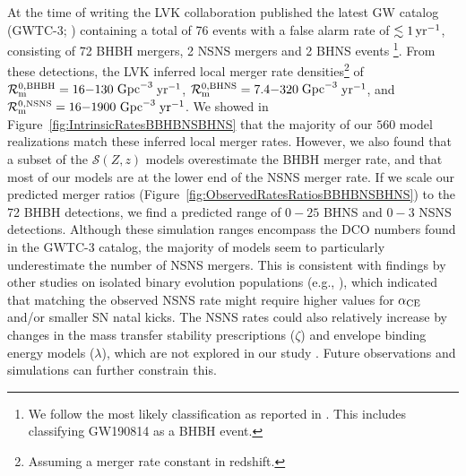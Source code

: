 \documentclass[fleqn,usenatbib]{mnras}
\newcommand\rate{\mathcal{R}}
\newcommand{\yearmin}{\ensuremath{\,\rm{yr}^{-1}}\xspace}
\newcommand{\GpcminThree}{\ensuremath{\,\rm{Gpc}^{-3}}\xspace}
\newcommand{\SFRD}{\ensuremath{\mathcal{S}(Z,z)}\xspace}
\newcommand{\Nmodels}{\ensuremath{560}\xspace}
\newcommand{\RateGWTCmaxBHBH}{\ensuremath{130}\xspace}
\newcommand{\RateGWTCminBHBH}{\ensuremath{16}\xspace}
\newcommand{\RateGWTCmaxBHNS}{\ensuremath{320}\xspace}
\newcommand{\RateGWTCminBHNS}{\ensuremath{7.4}\xspace}
\newcommand{\RateGWTCmaxNSNS}{\ensuremath{1900}\xspace}
\newcommand{\RateGWTCminNSNS}{\ensuremath{16}\xspace}
\begin{document}
At the time of writing the LVK collaboration published the latest \ac{GW} catalog (GWTC-3; \citealt{Abbott:2021GWTC3}) containing a total of 76 events with a false alarm rate of $\lesssim 1 \yearmin$, consisting of 72 \ac{BHBH} mergers, 2 \ac{NSNS} mergers and 2 \ac{BHNS} events \citet{Abbott:2021GWTC3pop}\footnote{We follow the most likely classification as reported in \citet{Abbott:2021GWTC3pop}. This includes classifying GW190814 as a BHBH event.}. From these detections, the LVK inferred local merger rate densities\footnote{Assuming a merger rate constant in redshift.} of $\rate_{\rm{m}}^{0,\rm{BHBH}}= \RateGWTCminBHBH{-}\RateGWTCmaxBHBH$\GpcminThree\yearmin,  $\rate_{\rm{m}}^{0,\rm{BHNS}} = \RateGWTCminBHNS{-}\RateGWTCmaxBHNS$\GpcminThree\yearmin, and  $\rate_{\rm{m}}^{0,\rm{NSNS}}  =  \RateGWTCminNSNS{-}\RateGWTCmaxNSNS$\GpcminThree\yearmin \citep{Abbott:2021GWTC3pop}. We showed in Figure~\ref{fig:IntrinsicRatesBBHBNSBHNS} that the majority of our \Nmodels model realizations match these inferred local merger rates. However, we also found that a subset of the \SFRD models overestimate the BHBH merger rate, and that most of our models are at the lower end of the NSNS merger rate. If we scale our predicted merger ratios (Figure~\ref{fig:ObservedRatesRatiosBBHBNSBHNS}) to the 72 \ac{BHBH} detections, we find a predicted range of  $0{-}25$ \ac{BHNS}  and $0{-}3$ \ac{NSNS} detections. Although these simulation ranges encompass the \ac{DCO} numbers found in the GWTC-3 catalog, the majority of models seem to particularly underestimate the number of NSNS mergers. This is consistent with findings by other studies on isolated binary evolution populations (e.g., \citealt{GiacobboMapelli:2018,Chruslinska:2018,Santoliquido:2021}), which indicated that matching the observed NSNS rate might require higher values for $\alpha_{\rm{CE}}$ and/or smaller \ac{SN} natal kicks. The NSNS rates could also relatively increase by changes in the mass transfer stability prescriptions ($\zeta$) and envelope binding energy models ($\lambda$), which are not explored in our study \citep[see][and references therein]{Han:2020,Lau:2021}. Future observations and simulations can further constrain this.
\end{document}
